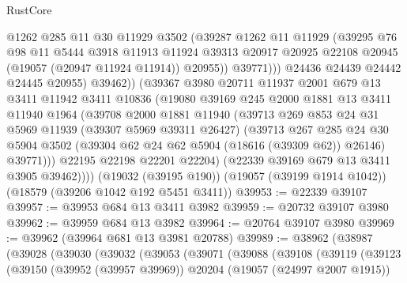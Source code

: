 \begin{lexlean}{RustCore}
\begin{coremodule}
                    @1262
                    @285
                    @11
                    @30
                    @11929
                    @3502
                    (@39287
                      @1262
                      @11
                      @11929
                      (@39295
                        @76
                        @98
                        @11
                        @5444
                        @3918
                        @11913
                        @11924
                        @39313
                        @20917
                        @20925
                        @22108
                        @20945
                        (@19057 (@20947 @11924 @11914))
                        @20955))
                    @39771)))
              @24436
              @24439
              @24442
              @24445
              @20955)
            @39462))
        (@39367
          @3980
          @20711
          @11937
          @2001
          @679
          @13
          @3411
          @11942
          @3411
          @10836
          (@19080
            @39169
            @245
            @2000
            @1881
            @13
            @3411
            @11940
            @1964
            (@39708
              @2000
              @1881
              @11940
              (@39713
                @269
                @853
                @24
                @31
                @5969
                @11939
                (@39307 @5969 @39311 @26427)
                (@39713
                  @267
                  @285
                  @24
                  @30
                  @5904
                  @3502
                  (@39304 @62 @24 @62 @5904 (@18616 (@39309 @62)) @26146)
                  @39771)))
            @22195
            @22198
            @22201
            @22204)
          (@22339 @39169 @679 @13 @3411 @3905 @39462))))
    (@19032 (@39195 @190))
    (@19057 (@39199 @1914 @1042))
    (@18579 (@39206 @1042 @192 @5451 @3411))
@39953 := @22339 @39107
@39957 := @39953 @684 @13 @3411 @3982
@39959 := @20732 @39107 @3980
@39962 := @39959 @684 @13 @3982
@39964 := @20764 @39107 @3980
@39969 := @39962 (@39964 @681 @13 @3981 @20788)
@39989 := @38962
    (@38987
      (@39028
        (@39030
          (@39032
            (@39053
              (@39071
                (@39088
                  (@39108
                    (@39119
                      (@39123
                        (@39150
                          (@39952 (@39957 @39969))
                          @20204
                          (@19057 (@24997 @2007 @1915))

\end{coremodule}
\end{lexlean}
